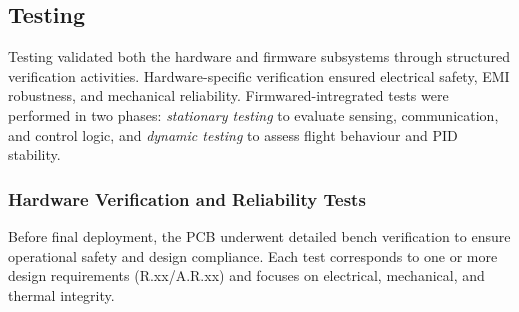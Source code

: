 \subsection{Testing}

Testing validated both the hardware and firmware subsystems through structured verification activities. Hardware-specific verification ensured electrical safety, EMI robustness, and mechanical reliability. Firmwared-intregrated tests were performed in two phases: \textit{stationary testing} to evaluate sensing, communication, and control logic, and \textit{dynamic testing} to assess flight behaviour and PID stability. 

\subsubsection{Hardware Verification and Reliability Tests}

Before final deployment, the PCB underwent detailed bench verification to ensure operational safety and design compliance. Each test corresponds to one or more design requirements (R.xx/A.R.xx) and focuses on electrical, mechanical, and thermal integrity.

